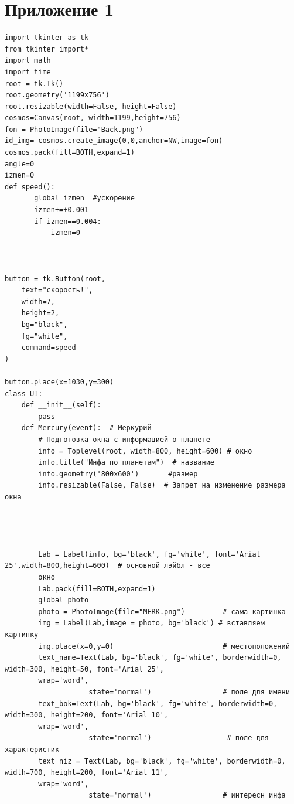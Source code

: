 \documentclass[11pt,a4paper]{report}
\begin{document}
\section{Приложение 1}
\scriptsize
\begin{verbatim}
import tkinter as tk
from tkinter import*
import math
import time
root = tk.Tk()
root.geometry('1199x756')
root.resizable(width=False, height=False)
cosmos=Canvas(root, width=1199,height=756)
fon = PhotoImage(file="Back.png")
id_img= cosmos.create_image(0,0,anchor=NW,image=fon)
cosmos.pack(fill=BOTH,expand=1)
angle=0
izmen=0
def speed():
       global izmen  #ускорение 
       izmen+=+0.001 
       if izmen==0.004:
           izmen=0
       
       
       
button = tk.Button(root,
    text="скорость!",
    width=7,
    height=2,
    bg="black",
    fg="white",
    command=speed
)
 
button.place(x=1030,y=300)
class UI:
    def __init__(self):
        pass
    def Mercury(event):  # Меркурий
        # Подготовка окна с информацией о планете
        info = Toplevel(root, width=800, height=600) # окно
        info.title("Инфа по планетам")  # название
        info.geometry('800x600')       #размер
        info.resizable(False, False)  # Запрет на изменение размера окна
        
        
        
    
        Lab = Label(info, bg='black', fg='white', font='Arial 25',width=800,height=600)  # основной лэйбл - все 
        окно
        Lab.pack(fill=BOTH,expand=1)
        global photo
        photo = PhotoImage(file="MERK.png")         # сама картинка
        img = Label(Lab,image = photo, bg='black') # вставляем картинку
        img.place(x=0,y=0)                          # местоположений
        text_name=Text(Lab, bg='black', fg='white', borderwidth=0, width=300, height=50, font='Arial 25', 
        wrap='word',
                    state='normal')                 # поле для имени
        text_bok=Text(Lab, bg='black', fg='white', borderwidth=0, width=300, height=200, font='Arial 10', 
        wrap='word',
                    state='normal')                  # поле для характеристик
        text_niz = Text(Lab, bg='black', fg='white', borderwidth=0, width=700, height=200, font='Arial 11', 
        wrap='word',
                    state='normal')                 # интересн инфа
    

\end{verbatim}
\end{document}
